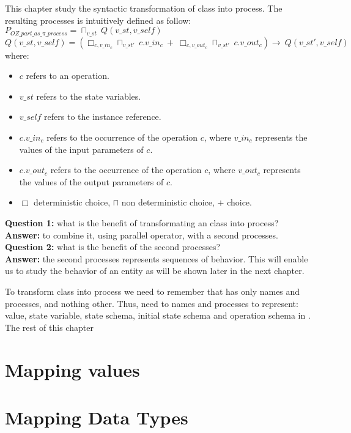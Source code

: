 This chapter study the syntactic transformation of \oz{} class into \picalc{} process. The resulting processes is intuitively defined as follow:\\
$P_{OZ\_part\_as\_\pi\_process} = \sqcap _{v\_st}\ Q(v\_st,v\_self)$\\
$Q(v\_st,v\_self) = (\Box _{c,v\_in_{c}} \sqcap _{v\_st'} \ c.v\_in_{c} \ + \ \Box _{c,v\_out_{c}} \sqcap _{v\_st'} \ c.v\_out_{c})\rightarrow \ Q(v\_st',v\_self)$
where:
\begin{itemize}
\item $c$ refers to an operation.
\item $v\_st$ refers to the state variables.
\item $v\_self$ refers to the instance reference.
\item $c.v\_in_{c}$ refers to the occurrence of the operation $c$, where $v\_in_{c}$ represents the values of the input parameters of $c$.
\item $c.v\_out_{c}$ refers to the occurrence of the operation $c$, where $v\_out_{c}$ represents the values of the output parameters of $c$.
\item $\Box$ deterministic choice, $\sqcap$ non deterministic choice, $+$ choice.
\end{itemize}
\textbf{Question 1:} what is the benefit of transformating an \oz{} class into \picalc{} process?\\
\textbf{Answer:} to combine it, using parallel operator, with a second \picalc{} processes.
\textbf{Question 2:} what is the benefit of the  second processes?\\
\textbf{Answer:} the second processes represents sequences of behavior. This will enable us to study the behavior of an entity as will be shown later in the next chapter.

To transform \oz{} class into \picalc{} process we need to remember that  \picalc{} has only names and processes, and nothing other. Thus, need to names and processes to represent: value, state variable, state schema, initial state schema and operation schema in \picalc{}. The rest of this chapter 
\section{Mapping values}
\label{sec_tra_oz_mapping_values}


\section{Mapping Data Types}
\label{sec_tra_oz_mapping_data_types}



